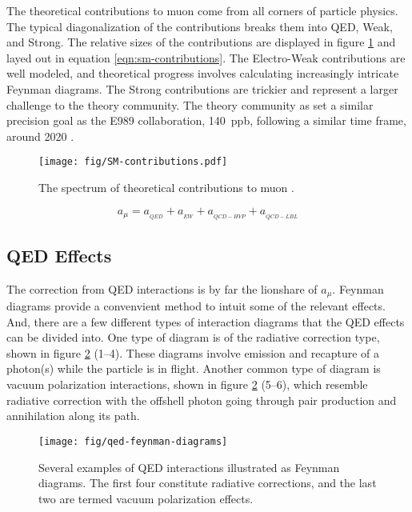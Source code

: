The theoretical contributions to muon \gmtwo come from all corners of particle physics.  The typical diagonalization of the contributions breaks them into QED, Weak, and Strong. The relative sizes of the contributions are displayed in figure \ref{fig:sm-contributions} and layed out in equation \ref{eqn:sm-contributions}. The Electro-Weak contributions are well modeled, and theoretical progress involves calculating increasingly intricate Feynman diagrams.  The Strong contributions are trickier and represent a larger challenge to the theory community.  The theory community as set a similar precision goal as the E989 collaboration, \SI{140}{ppb}, following a similar time frame, around 2020 \cite{e989-tdr}.

\begin{figure}
\texttt{[image: fig/SM-contributions.pdf]}
\label{fig:sm-contributions}
\caption{The spectrum of theoretical contributions to muon \gmtwo.}
\end{figure}

\begin{equation}
\label{eqn:sm-contributions}
a_\mu = a_{_{QED}} + a_{_{EW}} + a_{_{QCD-HVP}} + a_{_{QCD-LBL}}
\end{equation}

\subsection{QED Effects} \label{s-sec:theory-qed}

The correction from QED interactions is by far the lionshare of $a_\mu$.  Feynman diagrams provide a convenvient method to intuit some of the relevant effects.  And, there are a few different types of interaction diagrams that the QED effects can be divided into.  One type of diagram is of the radiative correction type, shown in figure \ref{fig:qed-feynman-diagrams} (1\hbox{--}4).  These diagrams involve emission and recapture of a photon(s) while the particle is in flight.  Another common type of diagram is vacuum polarization interactions, shown in figure \ref{fig:qed-feynman-diagrams} (5\hbox{--}6), which resemble radiative correction with the offshell photon going through pair production and annihilation along its path.

\begin{figure}
\label{fig:qed-feynman-diagrams}
\texttt{[image: fig/qed-feynman-diagrams]}
\caption{Several examples of QED interactions illustrated as Feynman diagrams.  The first four constitute radiative corrections, and the last two are termed vacuum polarization effects. }
\end{figure}

